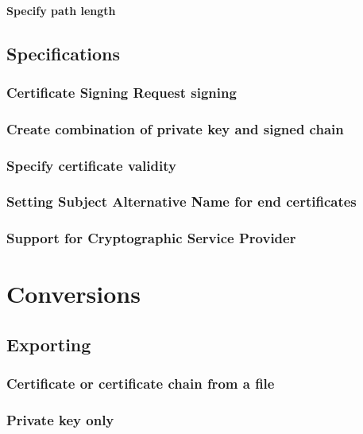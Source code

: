 \documentclass[10pt, a4paper]{report}
\begin{document}
      \paragraph{Specify path length}
      
  \subsection{Specifications}
  
    \subsubsection{Certificate Signing Request signing}
    
    \subsubsection{Create combination of private key and signed chain}
    
    \subsubsection{Specify certificate validity}
    
    \subsubsection{Setting Subject Alternative Name for end certificates}
    
    \subsubsection{Support for Cryptographic Service Provider}
    
\section{Conversions}

  \subsection{Exporting}
  
    \subsubsection{Certificate or certificate chain from a file}
    
    \subsubsection{Private key only}
    
\end{document}
